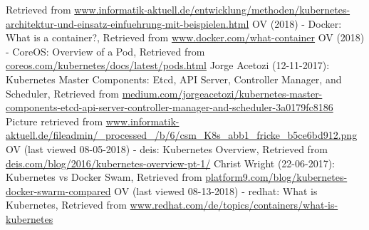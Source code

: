 \begin{thebibliography}{..........}
                              	Retrieved from \url{www.informatik-aktuell.de/entwicklung/methoden/kubernetes-architektur-und-einsatz-einfuehrung-mit-beispielen.html}
   \bibitem[]{}	OV (2018) - Docker:
                              	What is a container?,
                              	Retrieved from \url{www.docker.com/what-container}
   \bibitem[]{}	OV (2018) - CoreOS:
                              	Overview of a Pod,
                              	Retrieved from \url{coreos.com/kubernetes/docs/latest/pods.html}
   \bibitem[]{}	Jorge Acetozi (12-11-2017):
                              	Kubernetes Master Components: Etcd, API Server, Controller Manager, and Scheduler,
                              	Retrieved from \href{medium.com/jorgeacetozi/kubernetes-master-components-etcd-api-server-controller-manager-and-scheduler-3a0179fc8186}{medium.com/jorgeacetozi/kubernetes-master-components-etcd-api-server-controller-manager-and-scheduler-3a0179fc8186}
   \bibitem[]{}	Picture retrieved from \url{www.informatik-aktuell.de/fileadmin/_processed_/b/6/csm_K8s_abb1_fricke_b5ce6bd912.png}
   \bibitem[]{}	OV (last viewed 08-05-2018) - deis:
                              	Kubernetes Overview,
                              	Retrieved from \url{deis.com/blog/2016/kubernetes-overview-pt-1/}
   \bibitem[]{}	Christ Wright (22-06-2017):
                              	Kubernetes vs Docker Swam,
                              	Retrieved from \url{platform9.com/blog/kubernetes-docker-swarm-compared}
   	OV (last viewed 08-13-2018) - redhat:
   				What is Kubernetes,
   				Retrieved from \url{www.redhat.com/de/topics/containers/what-is-kubernetes}
\end{thebibliography}